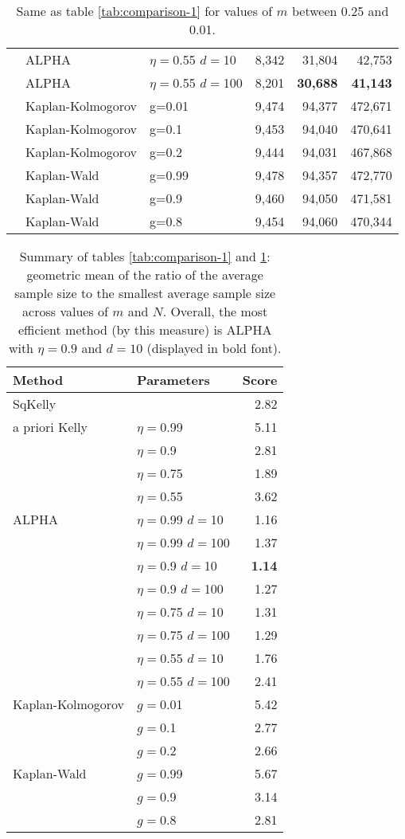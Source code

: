 \documentclass[12pt,runningheads]{llncs}
\begin{document}
{\begin{table}
\begin{tabular}{lll|rrr}
\cline{2-6}
& ALPHA & $\eta=$0.55 $d=$10 & 8,342  & 31,804  & 42,753  \\
& ALPHA & $\eta=$0.55 $d=$100 & 8,201  & \bf{30,688}  & \bf{41,143}  \\
\cline{2-6}
 & Kaplan-Kolmogorov & g=0.01 & 9,474  & 94,377  & 472,671  \\
 & Kaplan-Kolmogorov & g=0.1 & 9,453  & 94,040  & 470,641  \\
 & Kaplan-Kolmogorov & g=0.2 & 9,444  & 94,031  & 467,868  \\
\cline{2-6}
 & Kaplan-Wald & g=0.99 & 9,478  & 94,357  & 472,770  \\
 & Kaplan-Wald & g=0.9 & 9,460  & 94,050  & 471,581  \\
 & Kaplan-Wald & g=0.8 & 9,454  & 94,060  & 470,344  \\
 \end{tabular}
 \caption{\protect \label{tab:comparison-2} Same as table \ref{tab:comparison-1} for values of
$m$ between 0.25 and 0.01.}
\end{table}

\begin{table}
\centering
\tiny
\begin{tabular}{llr}\\ 
Method & Parameters & Score \\
\hline SqKelly & & 2.82 \\ 
 \hline a priori Kelly 
 & $\eta=$0.99 & 5.11 \\
 & $\eta=$0.9 & 2.81 \\
 & $\eta=$0.75 & 1.89 \\
 & $\eta=$0.55 & 3.62 \\
\hline ALPHA 
 & $\eta=$0.99 $d=$10 & 1.16 \\ 
 & $\eta=$0.99 $d=$100 & 1.37 \\ 
\cline{2-3}
 & $\eta=$0.9 $d=$10 & \bf{1.14} \\ 
 & $\eta=$0.9 $d=$100 & 1.27 \\ 
\cline{2-3}
 & $\eta=$0.75 $d=$10 & 1.31 \\ 
 & $\eta=$0.75 $d=$100 & 1.29 \\ 
\cline{2-3}
 & $\eta=$0.55 $d=$10 & 1.76 \\ 
 & $\eta=$0.55 $d=$100 & 2.41 \\ 
\cline{2-3}
\hline Kaplan-Kolmogorov
 & $g=$0.01 & 5.42\\ 
 & $g=$0.1 & 2.77\\ 
 & $g=$0.2 & 2.66\\ 
\hline Kaplan-Wald
 & $g=$0.99 & 5.67\\ 
 & $g=$0.9 & 3.14\\ 
 & $g=$0.8 & 2.81\\ 
\end{tabular}
\caption{\protect \label{tab:comparison-summary}
Summary of tables \ref{tab:comparison-1} and \ref{tab:comparison-2}: geometric mean of
the ratio of the average sample size to the smallest average sample size across values of $m$ and $N$.
Overall, the most efficient method (by this measure) is ALPHA with $\eta=0.9$ and $d=10$ (displayed in bold font).}
\end{table}

}
\end{document}
